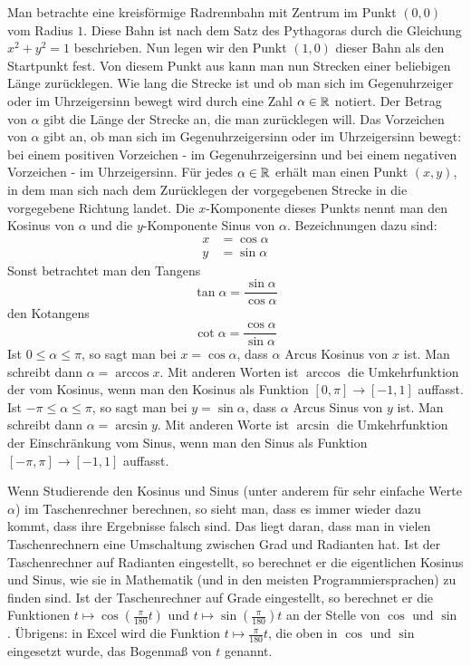 \begin{bem} 
 Man betrachte eine kreisförmige Radrennbahn mit Zentrum im Punkt $(0,0)$ vom Radius $1$. Diese Bahn ist nach dem Satz des Pythagoras durch die Gleichung $x^2 + y^2 = 1$ beschrieben. Nun legen wir den Punkt $(1,0)$ dieser Bahn als den Startpunkt fest. Von diesem Punkt aus kann man nun Strecken einer beliebigen Länge zurücklegen. Wie lang die Strecke ist und ob man sich im Gegenuhrzeiger oder im Uhrzeigersinn bewegt wird durch eine Zahl $\alpha \in \mathbb{R}$ notiert. Der Betrag von $\alpha$ gibt die Länge der Strecke an, die man zurücklegen will. Das Vorzeichen von $\alpha$ gibt an, ob man sich im Gegenuhrzeigersinn oder im Uhrzeigersinn bewegt: bei einem positiven Vorzeichen - im Gegenuhrzeigersinn und bei einem negativen Vorzeichen - im Uhrzeigersinn. Für jedes $\alpha \in \mathbb{R}$ erhält man einen Punkt $(x,y)$, in dem man sich nach dem Zurücklegen der vorgegebenen Strecke in die vorgegebene Richtung landet. Die $x$-Komponente dieses Punkts nennt man den Kosinus von $\alpha$ und die $y$-Komponente Sinus von $\alpha$. Bezeichnungen dazu sind: 
 \begin{align*} 
 	x & = \cos \alpha
 	\\ y & = \sin \alpha 
 \end{align*}	
Sonst betrachtet man den Tangens 
\[
	\tan \alpha = \frac{\sin \alpha}{\cos \alpha}
\]
 den Kotangens 
 \[
 	\cot \alpha = \frac{\cos \alpha}{\sin \alpha}
 \] 
 Ist $0 \le \alpha \le \pi$, so sagt man bei $x =\cos \alpha$, dass $\alpha$ Arcus Kosinus von $x$ ist. Man schreibt dann $\alpha = \arccos x$. Mit anderen Worten ist $\arccos$ die Umkehrfunktion der vom Kosinus, wenn man den Kosinus als Funktion $[0,\pi] \to [-1,1]$ auffasst. 
 Ist $-\pi \le \alpha \le \pi$, so sagt man bei $y = \sin \alpha$, dass $\alpha$ Arcus Sinus von $y$ ist. Man schreibt dann 
 $\alpha = \arcsin y$. Mit anderen Worte ist $\arcsin$ die Umkehrfunktion der Einschränkung vom Sinus, wenn man den Sinus als Funktion $[-\pi,\pi] \to [-1,1]$ auffasst. 
\end{bem} 

\begin{bem} Wenn Studierende den Kosinus und Sinus (unter anderem für sehr einfache Werte $\alpha$) im Taschenrechner berechnen, so sieht man, dass es immer wieder dazu kommt, dass ihre Ergebnisse falsch sind. Das liegt daran, dass man in vielen Taschenrechnern eine Umschaltung zwischen Grad und Radianten hat. Ist der Taschenrechner auf Radianten eingestellt, so berechnet er die eigentlichen  Kosinus und Sinus, wie sie in Mathematik (und in den meisten Programmiersprachen) zu finden sind. Ist der Taschenrechner auf Grade eingestellt, so berechnet er die Funktionen $t \mapsto \cos( \frac{\pi}{180}t)$ und $t \mapsto \sin( \frac{\pi}{180})t$ an der Stelle von $\cos$ und $\sin$. Übrigens: in Excel wird die Funktion $t \mapsto \frac{\pi}{180} t$, die oben in $\cos$ und $\sin$ eingesetzt wurde, das Bogenmaß von $t$ genannt. 
\end{bem} 

